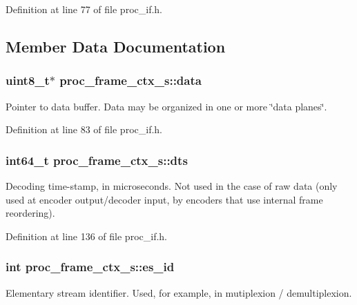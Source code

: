 Definition at line 77 of file proc\+\_\+if.\+h.



\subsection{Member Data Documentation}
\subsubsection[{\texorpdfstring{data}{data}}]{\setlength{\rightskip}{0pt plus 5cm}uint8\+\_\+t$\ast$ proc\+\_\+frame\+\_\+ctx\+\_\+s\+::data}\hypertarget{structproc__frame__ctx__s_ae3e8c9753324e6798ef8613fd3e772d2}{}\label{structproc__frame__ctx__s_ae3e8c9753324e6798ef8613fd3e772d2}
Pointer to data buffer. Data may be organized in one or more \char`\"{}data planes\char`\"{}. 

Definition at line 83 of file proc\+\_\+if.\+h.

\subsubsection[{\texorpdfstring{dts}{dts}}]{\setlength{\rightskip}{0pt plus 5cm}int64\+\_\+t proc\+\_\+frame\+\_\+ctx\+\_\+s\+::dts}\hypertarget{structproc__frame__ctx__s_a7300cb89fc1872dbcad499aa4d8435dd}{}\label{structproc__frame__ctx__s_a7300cb89fc1872dbcad499aa4d8435dd}
Decoding time-\/stamp, in microseconds. Not used in the case of raw data (only used at encoder output/decoder input, by encoders that use internal frame reordering). 

Definition at line 136 of file proc\+\_\+if.\+h.

\subsubsection[{\texorpdfstring{es\+\_\+id}{es_id}}]{\setlength{\rightskip}{0pt plus 5cm}int proc\+\_\+frame\+\_\+ctx\+\_\+s\+::es\+\_\+id}\hypertarget{structproc__frame__ctx__s_a457dcb8ae6440506054f07483f48be1f}{}\label{structproc__frame__ctx__s_a457dcb8ae6440506054f07483f48be1f}
Elementary stream identifier. Used, for example, in mutiplexion / demultiplexion. 

